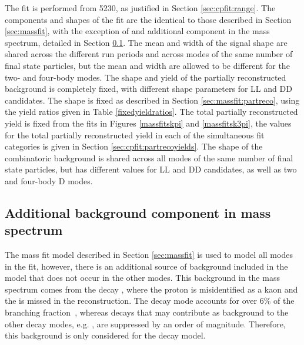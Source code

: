 The \CP fit is performed from 5230\mevcc, as justified in Section \ref{sec:cpfit:range}. The components and shapes of the \CP fit are the identical to those described in Section \ref{sec:massfit}, with the exception of and additional component in the \kk mass spectrum, detailed in Section \ref{sec:cpfit:Lb2LcKst}. The mean and width of the signal shape are shared across the different run periods and across modes of the same number of final state particles, but the mean and width are allowed to be different for the two- and four-body modes. The shape and yield of the partially reconstructed background is completely fixed, with different shape parameters for LL and DD candidates. The shape is fixed as described in Section \ref{sec:massfit:partreco}, using the yield ratios given in Table \ref{fixedyieldratios}. The total partially reconstructed yield is fixed from the fits in Figures \ref{massfitskpi} and \ref{massfitsk3pi}, the values for the total partially reconstructed yield in each of the simultaneous fit categories is given in Section \ref{sec:cpfit:partrecoyields}. The shape of the combinatoric background is shared across all modes of the same number of final state particles, but has different values for LL and DD candidates, as well as two and four-body D modes.

\subsection{Additional background component in \kk mass spectrum}
\label{sec:cpfit:Lb2LcKst}

The mass fit model described in Section \ref{sec:massfit} is used to model all \Dz modes in the \CP fit, however, there is an additional source of background included in the \kk model that does not occur in the other modes. This background in the \kk \Bm mass spectrum comes from the decay , where the proton is misidentified as a kaon and the \pion is missed in the reconstruction. The decay mode  accounts for over 6\% of the \Lc branching fraction~\cite{PDG2016}, whereas \Lc decays that may contribute as background to the other \Dz decay modes, e.g. , are suppressed by an order of magnitude. Therefore, this background is only considered for the \kk decay model.

